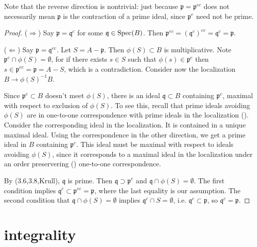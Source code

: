 \documentclass[12pt]{article}
\begin{document}
\begin{remark}
	Note that the reverse direction is nontrivial: just because $\mathfrak{p}=\mathfrak{p}^{ec}$ does not necessarily mean $\mathfrak{p}$ is the contraction of a prime ideal, since $\mathfrak{p}^e$ need not be prime.
\end{remark}

\begin{proof}
	($\Rightarrow$) Say $\mathfrak{p}=\mathfrak{q}^c$ for some $\mathfrak{q}\in\text{Spec}(B)$. Then $\mathfrak{p}^{ec}=(\mathfrak{q}^c)^{ec}=\mathfrak{q}^c=\mathfrak{p}$. 

	($\Leftarrow$) Say $\mathfrak{p}=\mathfrak{q}^{ec}$. Let $S=A-\mathfrak{p}$. Then $\phi(S)\subset B$ is multiplicative. Note $\mathfrak{p}^e\cap\phi(S)=\emptyset$, for if there exists $s\in S$ such that $\phi(s)\in\mathfrak{p}^e$ then $s\in\mathfrak{p}^{ec}=\mathfrak{p}=A-S$, which is a contradiction. Consider now the localization $B\to \phi(S)^{-1}B$. 

	Since $\mathfrak{p}^e\subset B$ doesn't meet $\phi(S)$, there is an ideal $\mathfrak{q}\subset B$ containing $\mathfrak{p}^e$, maximal with respect to exclusion of $\phi(S)$. To see this, recall that prime ideals avoiding $\phi(S)$ are in one-to-one correspondence with prime ideals in the localization (). Consider the corresponding ideal in the localization. It is contained in a unique maximal ideal. Using the correspondence in the other direction, we get a prime ideal in $B$ containing $\mathfrak{p}^e$. This ideal must be maximal with respect to ideals avoiding $\phi(S)$, since it corresponds to a maximal ideal in the localization under an order preservering () one-to-one correspondence.

	By (3.6,3.8,Krull), $\mathfrak{q}$ is prime. Then $\mathfrak{q}\supset\mathfrak{p}^e$ and $\mathfrak{q}\cap\phi(S)=\emptyset$. The first condition implies $\mathfrak{q}^c\subset\mathfrak{p}^{ec}=\mathfrak{p}$, where the last equality is our assumption. The second condition that $\mathfrak{q}\cap\phi(S)=\emptyset$ implies $\mathfrak{q}^c\cap S=\emptyset$, i.e. $\mathfrak{q}^c\subset\mathfrak{p}$, so $\mathfrak{q}^c=\mathfrak{p}$.
\end{proof}




\section{integrality} %
\end{document}
